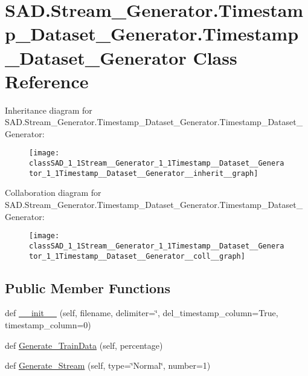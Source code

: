 \hypertarget{classSAD_1_1Stream__Generator_1_1Timestamp__Dataset__Generator_1_1Timestamp__Dataset__Generator}{}\section{S\+A\+D.\+Stream\+\_\+\+Generator.\+Timestamp\+\_\+\+Dataset\+\_\+\+Generator.\+Timestamp\+\_\+\+Dataset\+\_\+\+Generator Class Reference}
\label{classSAD_1_1Stream__Generator_1_1Timestamp__Dataset__Generator_1_1Timestamp__Dataset__Generator}


Inheritance diagram for S\+A\+D.\+Stream\+\_\+\+Generator.\+Timestamp\+\_\+\+Dataset\+\_\+\+Generator.\+Timestamp\+\_\+\+Dataset\+\_\+\+Generator\+:\nopagebreak
\begin{figure}[H]
\begin{center}
\leavevmode
\texttt{[image: classSAD\_1\_1Stream\_\_Generator\_1\_1Timestamp\_\_Dataset\_\_Generator\_1\_1Timestamp\_\_Dataset\_\_Generator\_\_inherit\_\_graph]}
\end{center}
\end{figure}


Collaboration diagram for S\+A\+D.\+Stream\+\_\+\+Generator.\+Timestamp\+\_\+\+Dataset\+\_\+\+Generator.\+Timestamp\+\_\+\+Dataset\+\_\+\+Generator\+:\nopagebreak
\begin{figure}[H]
\begin{center}
\leavevmode
\texttt{[image: classSAD\_1\_1Stream\_\_Generator\_1\_1Timestamp\_\_Dataset\_\_Generator\_1\_1Timestamp\_\_Dataset\_\_Generator\_\_coll\_\_graph]}
\end{center}
\end{figure}
\subsection*{Public Member Functions}
\begin{DoxyCompactItemize}
\item 
def \hyperlink{classSAD_1_1Stream__Generator_1_1Timestamp__Dataset__Generator_1_1Timestamp__Dataset__Generator_a5c48488d2bc6122cddc3f0c68587b820}{\+\_\+\+\_\+init\+\_\+\+\_\+} (self, filename, delimiter=\char`\"{},  del\+\_\+timestamp\+\_\+column=True,  timestamp\+\_\+column=0)
\item 
def \hyperlink{classSAD_1_1Stream__Generator_1_1Timestamp__Dataset__Generator_1_1Timestamp__Dataset__Generator_a90679f7d1b4dab5dbff87b7f44cba086}{Generate\+\_\+\+Train\+Data} (self, percentage)
\item 
def \hyperlink{classSAD_1_1Stream__Generator_1_1Timestamp__Dataset__Generator_1_1Timestamp__Dataset__Generator_ae70570bad46cda549ce8adce51f32b12}{Generate\+\_\+\+Stream} (self, type=\char`\"{}Normal\char`\"{}, number=1)
\end{DoxyCompactItemize}
